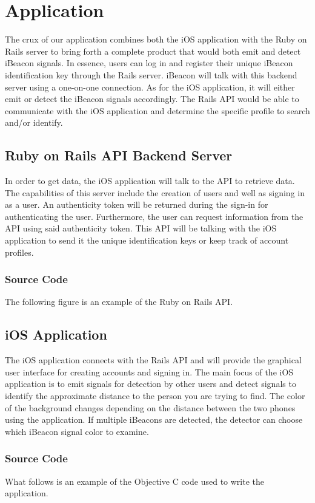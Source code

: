 \documentclass[10pt]{sensys-proc}
\begin{document}
\section{Application}
The crux of our application combines both the iOS application with the Ruby on Rails server to bring forth a complete product that would both emit and detect iBeacon signals. In essence, users can log in and register their unique iBeacon identification key through the Rails server. iBeacon will talk with this backend server using a one-on-one connection. As for the iOS application, it will either emit or detect the iBeacon signals accordingly. The Rails API would be able to communicate with the iOS application and determine the specific profile to search and/or identify.

\subsection{Ruby on Rails API Backend Server}
In order to get data, the iOS application will talk to the API to retrieve data. The capabilities of this server include the creation of users and well as signing in as a user. An authenticity token will be returned during the sign-in for authenticating the user. Furthermore, the user can request information from the API using said authenticity token. This API will be talking with the iOS application to send it the unique identification keys or keep track of account profiles.

\subsubsection{Source Code}
The following figure is an example of the Ruby on Rails API.

\subsection{iOS Application}
The iOS application connects with the Rails API and will provide the graphical user interface for creating accounts and signing in. The main focus of the iOS application is to emit signals for detection by other users and detect signals to identify the approximate distance to the person you are trying to find. The color of the background changes depending on the distance between the two phones using the application. If multiple iBeacons are detected, the detector can choose which iBeacon signal color to examine.

\subsubsection{Source Code}
What follows is an example of the Objective C code used to write the application.
\end{document}
